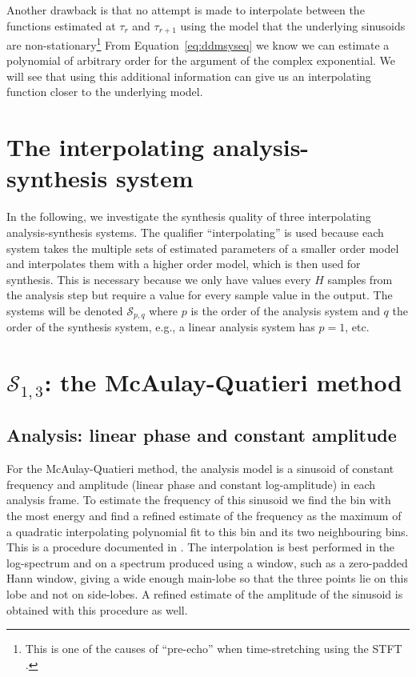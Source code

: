 Another drawback is that no attempt is made to interpolate between the functions
estimated at $\tau_{r}$ and $\tau_{r+1}$ using the model that the underlying
sinusoids are non-stationary\footnote{%
    This is one of the causes of ``pre-echo'' when
    time-stretching using the STFT \cite{roebel2003transient}.%
}
From Equation~\ref{eq:ddmsyseq} we know we can estimate a polynomial of
arbitrary order for the argument of the complex exponential. We will see that
using this additional information can give us an interpolating function closer
to the underlying model.

\section{The interpolating analysis-synthesis system}

In the following, we investigate the synthesis quality of three interpolating
analysis-synthesis systems. The qualifier ``interpolating'' is used because each
system takes the multiple sets of estimated parameters of a smaller order model
and interpolates them with a higher order model, which is then used for
synthesis. This is necessary because we only have values every $H$ samples from
the analysis step but require a value for every sample value in the output. The
systems will be denoted $\mathscr{S}_{p,q}$ where $p$ is the order of the
analysis system and $q$ the order of the synthesis system, e.g., a linear
analysis system has $p=1$, etc.

\section{$\mathscr{S}_{1,3}$: the McAulay-Quatieri method}

\subsection{Analysis: linear phase and constant amplitude%
\label{sec:S13analysis}}

For the McAulay-Quatieri method, the analysis model is a sinusoid of constant frequency
and amplitude
(linear phase and constant log-amplitude) in each analysis frame. To estimate the frequency of this
sinusoid we find the bin with the most energy and find a refined estimate of the
frequency as the maximum of a quadratic interpolating polynomial fit to this bin
and its two neighbouring bins. This is a procedure documented in
\cite[p.~45]{serra1989system}. The interpolation is best performed in the
log-spectrum and on a spectrum produced using a window, such as a zero-padded
Hann window, giving a wide enough main-lobe so that the three points lie on this
lobe and not on side-lobes. A refined estimate of the amplitude of the sinusoid
is obtained with this procedure as well.

